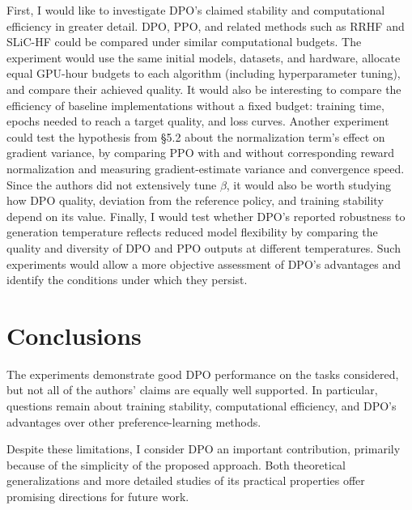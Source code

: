 \documentclass[11pt,a4paper]{article}
\theoremstyle{remark}
\begin{document}
First, I would like to investigate DPO's claimed stability and computational efficiency in greater detail. DPO, PPO, and related methods such as RRHF and SLiC-HF could be compared under similar computational budgets. The experiment would use the same initial models, datasets, and hardware, allocate equal GPU-hour budgets to each algorithm (including hyperparameter tuning), and compare their achieved quality. It would also be interesting to compare the efficiency of baseline implementations without a fixed budget: training time, epochs needed to reach a target quality, and loss curves. Another experiment could test the hypothesis from \S 5.2 about the normalization term's effect on gradient variance, by comparing PPO with and without corresponding reward normalization and measuring gradient-estimate variance and convergence speed. Since the authors did not extensively tune $\beta$, it would also be worth studying how DPO quality, deviation from the reference policy, and training stability depend on its value. Finally, I would test whether DPO's reported robustness to generation temperature reflects reduced model flexibility by comparing the quality and diversity of DPO and PPO outputs at different temperatures. Such experiments would allow a more objective assessment of DPO's advantages and identify the conditions under which they persist.

\section{Conclusions}

The experiments demonstrate good DPO performance on the tasks considered, but not all of the authors' claims are equally well supported. In particular, questions remain about training stability, computational efficiency, and DPO's advantages over other preference-learning methods.

Despite these limitations, I consider DPO an important contribution, primarily because of the simplicity of the proposed approach. Both theoretical generalizations and more detailed studies of its practical properties offer promising directions for future work.
\end{document}
